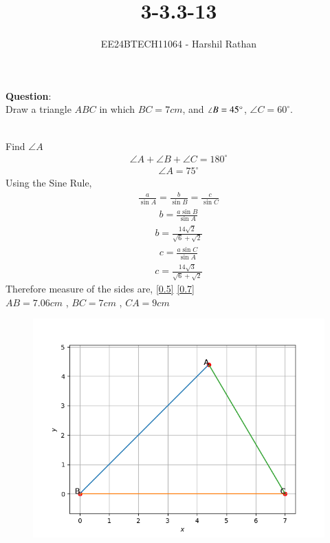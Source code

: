 \documentclass[journal]{IEEEtran}
\begin{document}

\vspace{3cm}

\title{3-3.3-13}
\author{EE24BTECH11064 - Harshil Rathan}
{\let\newpage\relax\maketitle}

\renewcommand{\thefigure}{\theenumi}
\renewcommand{\thetable}{\theenumi}
\setlength{\intextsep}{10pt} %


\renewcommand{\thetable}{\theenumi}
\textbf{Question}:\\
Draw a triangle $ABC$ in which $BC = 7cm$, and $\angle B = 45\degree$, $\angle{C}=60^\circ$.\\
\solution \\
\begin{table}[h!]
    \centering
    
\end{table}
Find $\angle{A}$
\begin{align}
     \angle{A}+\angle{B}+\angle{C}=180^\circ 
\end{align}    
\begin{align}    
     \angle{A}=75^\circ
\end{align}
Using the Sine Rule,
\begin{align}
    \frac{a}{\sin{A}}=\frac{b}{\sin{B}}=\frac{c}{\sin{C}}
    \label{0.3}
\end{align}
\begin{align}
    b=\frac{a \sin B}{\sin A} 
\end{align}
\begin{align}
    b=\frac{14\sqrt{2}}{\sqrt{6}+\sqrt{2}}
    \label{0.5}
\end{align}
\begin{align}
    c=\frac{a \sin C}{\sin A}
\end{align}
\begin{align}
      c= \frac{14\sqrt3}{\sqrt6+\sqrt2}
      \label{0.7}
\end{align}
Therefore measure of the sides are, \ref{0.5} \ref{0.7} \\
$AB=7.06cm$ , $BC=7cm$ , $CA=9cm$
\begin{figure}[h!]
   \centering
   \includegraphics[width=\linewidth]{figs/Figure_1.png}
   \caption{}
   \label{stemplot}
\end{figure}
\end{document}
